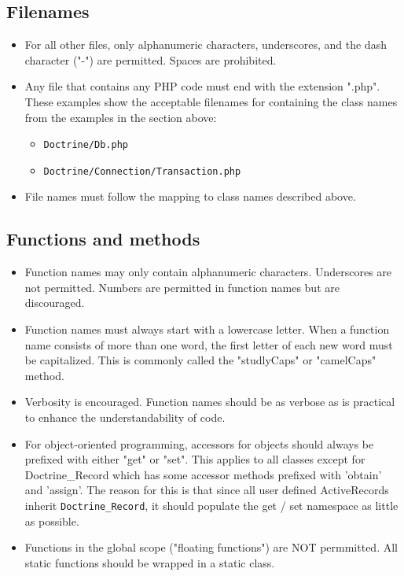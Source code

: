 \documentclass[11pt,a4paper]{report}
\begin{document}
\subsection{Filenames}
\begin{itemize}
\item{For all other files, only alphanumeric characters, underscores, and the dash character ("-") are permitted. Spaces are prohibited.}
\item{Any file that contains any PHP code must end with the extension ".php". These examples show the acceptable filenames for containing the class names from the examples in the section above:}
\begin{itemize}
\item{\texttt{Doctrine/Db.php}}
\item{\texttt{Doctrine/Connection/Transaction.php}}
\end{itemize}
\item{File names must follow the mapping to class names described above.}
\end{itemize}
\subsection{Functions and methods}
\begin{itemize}
\item{Function names may only contain alphanumeric characters. Underscores are not permitted. Numbers are permitted in function names but are discouraged.}
\item{Function names must always start with a lowercase letter. When a function name consists of more than one word, the first letter of each new word must be capitalized. This is commonly called the "studlyCaps" or "camelCaps" method.}
\item{Verbosity is encouraged. Function names should be as verbose as is practical to enhance the understandability of code.}
\item{For object-oriented programming, accessors for objects should always be prefixed with either "get" or "set". This applies to all classes except for Doctrine\_Record which has some accessor methods prefixed with 'obtain' and 'assign'. The reason for this is that since all user defined ActiveRecords inherit \texttt{Doctrine\_Record}, it should populate the get / set namespace as little as possible.}
\item{Functions in the global scope ("floating functions") are NOT permmitted. All static functions should be wrapped in a static class.}
\end{itemize}
\end{document}
